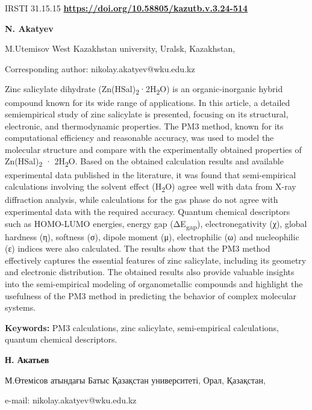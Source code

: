 \newpage
IRSTI 31.15.15
\hfill {\bfseries \href{https://doi.org/10.58805/kazutb.v.3.24-514}{https://doi.org/10.58805/kazutb.v.3.24-514}}


\begin{center}
{\bfseries N. Akatyev}

M.Utemisov West Kazakhstan university, Uralsk, Kazakhstan,
\end{center}
\envelope Corresponding author: nikolay.akatyev@wku.edu.kz


Zinc salicylate dihydrate
(Zn(HSal)\textsubscript{2}·2H\textsubscript{2}O) is an organic-inorganic
hybrid compound known for its wide range of applications. In this
article, a detailed semiempirical study of zinc salicylate is presented,
focusing on its structural, electronic, and thermodynamic properties.
The PM3 method, known for its computational efficiency and reasonable
accuracy, was used to model the molecular structure and compare with the
experimentally obtained properties of
Zn(HSal)\textsubscript{2} · 2H\textsubscript{2}O. Based on the obtained
calculation results and available experimental data published in the
literature, it was found that semi-empirical calculations involving the
solvent effect (H\textsubscript{2}O) agree well with data from X-ray
diffraction analysis, while calculations for the gas phase do not agree
with experimental data with the required accuracy. Quantum chemical
descriptors such as HOMO-LUMO energies, energy gap
(ΔE\textsubscript{gap}), electronegativity (χ), global hardness (η),
softness (σ), dipole moment (μ), electrophilic (ω) and nucleophilic (ε)
indices were also calculated. The results show that the PM3 method
effectively captures the essential features of zinc salicylate,
including its geometry and electronic distribution. The obtained results
also provide valuable insights into the semi-empirical modeling of
organometallic compounds and highlight the usefulness of the PM3 method
in predicting the behavior of complex molecular systems.

{\bfseries Keywords:} PM3 calculations, zinc salicylate, semi-empirical
calculations, quantum chemical descriptors.


\begin{center}
{\bfseries Н. Акатьев}

М.Өтемісов атындағы Батыс Қазақстан университеті, Орал, Қазақстан,

e-mail: nikolay.akatyev@wku.edu.kz
\end{center}

